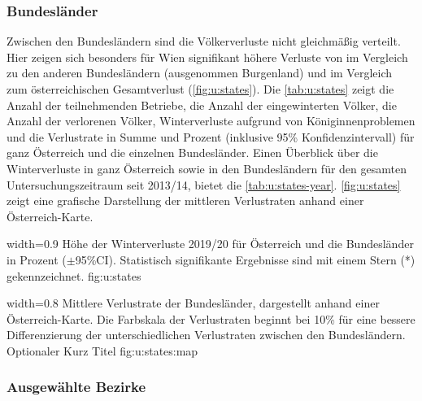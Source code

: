 \subsubsection{Bundesländer}

Zwischen den Bundesländern sind die Völkerverluste nicht gleichmäßig verteilt. Hier zeigen sich besonders für Wien signifikant höhere Verluste von  im Vergleich zu den anderen Bundesländern (ausgenommen Burgenland) und im Vergleich zum österreichischen Gesamtverlust (\cref{fig:u:states}). Die \cref{tab:u:states} zeigt die Anzahl der teilnehmenden Betriebe, die Anzahl der eingewinterten Völker, die Anzahl der verlorenen Völker, Winterverluste aufgrund von Königinnenproblemen und die Verlustrate in Summe und Prozent (inklusive 95\% Konfidenzintervall) für ganz Österreich und die einzelnen Bundesländer. Einen Überblick über die Winterverluste in ganz Österreich sowie in den Bundesländern für den gesamten Untersuchungszeitraum seit 2013/14, bietet die \cref{tab:u:states-year}. \cref{fig:u:states} zeigt eine grafische Darstellung der mittleren Verlustraten anhand einer Österreich-Karte.

  {width=0.9\textwidth} %
  {Höhe der Winterverluste 2019/20 für Österreich und die Bundesländer in Prozent ($\pm$95\%CI). Statistisch signifikante Ergebnisse sind mit einem Stern (*) gekennzeichnet.} %
  {} %
  {fig:u:states} %
  
  {width=0.8\textwidth} %
  {Mittlere Verlustrate der Bundesländer, dargestellt anhand einer Österreich-Karte. Die Farbskala der Verlustraten beginnt bei 10\% für eine bessere Differenzierung der unterschiedlichen Verlustraten zwischen den Bundesländern.} %
  {Optionaler Kurz Titel} %
  {fig:u:states:map} %




\newpage 

\subsubsection{Ausgewählte Bezirke}

